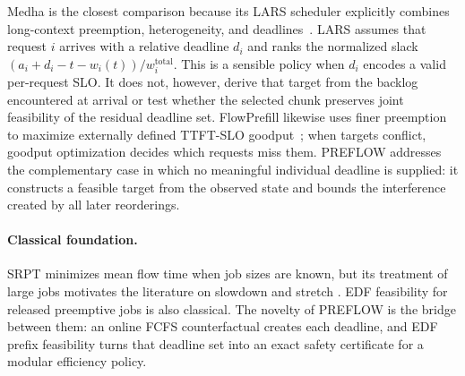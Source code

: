 \documentclass{article}
\newcommand{\preflow}{\textnormal{\textsc{PREFLOW}}}
\begin{document}
Medha is the closest comparison because its LARS scheduler explicitly combines
long-context preemption, heterogeneity, and deadlines~\citep{agrawal2024medha}.
LARS assumes that request $i$ arrives with a relative deadline $d_i$ and ranks
the normalized slack
$(a_i+d_i-t-w_i(t))/w_i^{\mathrm{total}}$.  This is a sensible policy when
$d_i$ encodes a valid per-request SLO.  It does not, however, derive that target
from the backlog encountered at arrival or test whether the selected chunk
preserves joint feasibility of the residual deadline set.  FlowPrefill likewise
uses finer preemption to maximize externally defined TTFT-SLO
goodput~\citep{hsieh2026flowprefill}; when targets conflict, goodput optimization
decides which requests miss them.  \preflow{} addresses the complementary case
in which no meaningful individual deadline is supplied: it constructs a
feasible target from the observed state and bounds the interference created by
all later reorderings.

\paragraph{Classical foundation.}
SRPT minimizes mean flow time when job sizes are known, but its treatment of
large jobs motivates the literature on slowdown and stretch
\citep{bender1998flow,muthukrishnan1999online,bansal2001srpt}.  EDF feasibility
for released preemptive jobs is also classical.  The novelty of \preflow{} is
the bridge between them: an online FCFS counterfactual creates each deadline,
and EDF prefix feasibility turns that deadline set into an exact safety
certificate for a modular efficiency policy.
\end{document}
